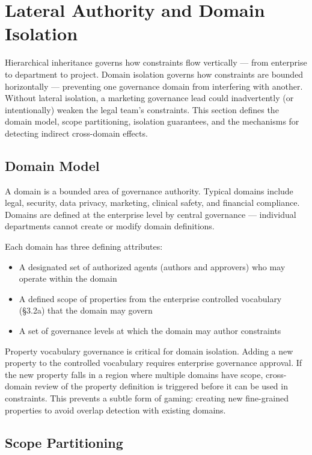 \section{Lateral Authority and Domain Isolation}
\label{sec:prompt-7}


Hierarchical inheritance governs how constraints flow vertically --- from enterprise to department to project. Domain isolation governs how constraints are bounded horizontally --- preventing one governance domain from interfering with another. Without lateral isolation, a marketing governance lead could inadvertently (or intentionally) weaken the legal team's constraints. This section defines the domain model, scope partitioning, isolation guarantees, and the mechanisms for detecting indirect cross-domain effects.

\subsection{Domain Model}


A domain is a bounded area of governance authority. Typical domains include legal, security, data privacy, marketing, clinical safety, and financial compliance. Domains are defined at the enterprise level by central governance --- individual departments cannot create or modify domain definitions.

Each domain has three defining attributes:

\begin{itemize}
  \item A designated set of authorized agents (authors and approvers) who may operate within the domain
  \item A defined scope of properties from the enterprise controlled vocabulary (\S{}3.2a) that the domain may govern
  \item A set of governance levels at which the domain may author constraints
\end{itemize}


Property vocabulary governance is critical for domain isolation. Adding a new property to the controlled vocabulary requires enterprise governance approval. If the new property falls in a region where multiple domains have scope, cross-domain review of the property definition is triggered before it can be used in constraints. This prevents a subtle form of gaming: creating new fine-grained properties to avoid overlap detection with existing domains.

\subsection{Scope Partitioning}


